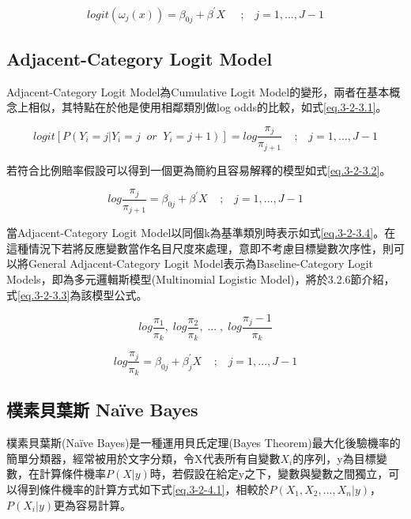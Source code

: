 \begin{equation}
\label{eq.3-2-2.4}
	logit(\omega_j(x)) =  \beta_{0j} + \beta^{'}X \;\;\;\;\;;\;\;\; j = 1,...,J-1
\end{equation}
	
	
\subsection{Adjacent-Category Logit Model}

	Adjacent-Category Logit Model為Cumulative Logit Model的變形，兩者在基本概念上相似，其特點在於他是使用相鄰類別做log odds的比較，如式\ref{eq.3-2-3.1}。

\begin{equation}
\label{eq.3-2-3.1}
	logit[P(Y_i = j | Y_i= j\;\;or\;\;Y_i = j + 1)] = log\frac{\pi_j}{\pi_{j+1}} \;\;\;\;;\;\;\; j = 1 ,..., J - 1
\end{equation}

	若符合比例賠率假設可以得到一個更為簡約且容易解釋的模型如式\ref{eq.3-2-3.2}。
	
\begin{equation}
\label{eq.3-2-3.2}
	log\frac{\pi_j}{\pi_{j+1}} = \beta_{0j} + \beta^{'}X \;\;\;\;;\;\;\; j = 1 ,..., J - 1
\end{equation}	
	

	當Adjacent-Category Logit Model以同個k為基準類別時表示如式\ref{eq.3-2-3.4}。在這種情況下若將反應變數當作名目尺度來處理，意即不考慮目標變數次序性，則可以將General Adjacent-Category Logit Model表示為Baseline-Category Logit Models，即為多元邏輯斯模型(Multinomial Logistic Model)，將於3.2.6節介紹，式\ref{eq.3-2-3.3}為該模型公式。
	
\begin{equation}
\label{eq.3-2-3.4}
log\frac{\pi_1}{\pi_k},\;log\frac{\pi_2}{\pi_k},\;...\;,\;log\frac{\pi_j-1}{\pi_k}
\end{equation}	
	
\begin{equation}
\label{eq.3-2-3.3}
	log\frac{\pi_j}{\pi_{k}} = \beta_{0j} + \beta^{'}_jX \;\;\;\;;\;\;\; j = 1 ,..., J - 1
\end{equation}		
	
	
\subsection{樸素貝葉斯 Naïve Bayes}

	樸素貝葉斯(Naïve Bayes)是一種運用貝氏定理(Bayes Theorem)最大化後驗機率的簡單分類器，經常被用於文字分類，令X代表所有自變數$X_i$的序列，y為目標變數，在計算條件機率$P(X|y)$時，若假設在給定y之下，變數與變數之間獨立，可以得到條件機率的計算方式如下式\ref{eq.3-2-4.1}，相較於$P(X_1,X_2,...,X_n|y)$，$P(X_i|y)$更為容易計算。

